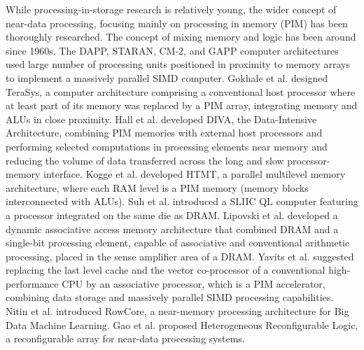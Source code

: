\documentclass{superfri}
\begin{document}
	
	While processing-in-storage research is relatively young, the wider concept of near-data processing, focusing mainly on processing in memory (PIM) has been thoroughly researched. The concept of mixing memory and logic has been around since 1960s. The DAPP, STARAN, CM-2, and GAPP computer architectures \cite{potter1989array} used large number of processing units positioned in proximity to memory arrays to implement a massively parallel SIMD computer. Gokhale et al. \cite{gokhale1995processing} designed TeraSys, a computer architecture comprising a conventional host processor where at least part of its memory was replaced by a PIM array, integrating memory and ALUs in close proximity. Hall et al. \cite{hall1999mapping} developed DIVA, the Data-Intensive Architecture, combining PIM memories with external host processors and performing selected computations in processing elements near memory and reducing the volume of data transferred across the long and slow processor-memory interface. Kogge et al. \cite{kogge2000pim} developed HTMT, a parallel multilevel memory architecture, where each RAM level is a PIM memory (memory blocks interconnected with ALUs). Suh et al. \cite{suh2001pim}  introduced a SLIIC QL computer featuring a processor integrated on the same die as DRAM. Lipovski et al. \cite{lipovski1999dynamic} developed a dynamic associative access memory architecture that combined DRAM and a single-bit processing element, capable of associative and conventional arithmetic processing, placed in the sense amplifier area of a DRAM. Yavits et al. \cite{yavits2015computer} suggested replacing the last level cache and the vector co-processor of a conventional high-performance CPU by an associative processor, which is a PIM accelerator, combining data storage and massively parallel SIMD processing capabilities. Nitin et al. \cite{thottethodi2016rowcore} introduced RowCore, a near-memory processing architecture for Big Data Machine Learning. Gao et al. \cite{gao2016hrl} proposed Heterogeneous Reconfigurable Logic, a reconfigurable array for near-data processing systems.
	
\end{document}
